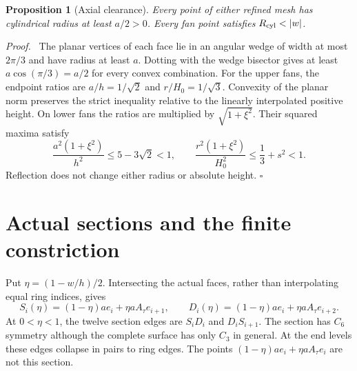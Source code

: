 \documentclass[11pt,a4paper]{article}
\numberwithin{equation}{section}
\newtheorem{proposition}[theorem]{Proposition}
\newenvironment{proof}[1][Proof]{\par\noindent\textit{#1.}\ \ignorespaces}
{\unskip\nobreak\hfill$\square$\par}
\begin{document}
\begin{proposition}[Axial clearance]\label{prop:clearance}
Every point of either refined mesh has cylindrical radius at least $a/2>0$.
Every fan point satisfies $R_{\rm cyl}<|w|$.
\end{proposition}
\begin{proof}
The planar vertices of each face lie in an angular wedge of width at most
$2\pi/3$ and have radius at least $a$. Dotting with the wedge bisector gives
at least $a\cos(\pi/3)=a/2$ for every convex combination. For the upper fans,
the endpoint ratios are $a/h=1/\sqrt2$ and $r/H_0=1/\sqrt3$. Convexity of
the planar norm preserves the strict inequality relative to the linearly
interpolated positive height. On lower fans the ratios are multiplied by
$\sqrt{1+\xi^2}$. Their squared maxima satisfy
\[
\frac{a^2(1+\xi^2)}{h^2}\leq5-3\sqrt2<1,\qquad
\frac{r^2(1+\xi^2)}{H_0^2}\leq\frac13+s^2<1.
\]
Reflection does not change either radius or absolute height.
\end{proof}

\section{Actual sections and the finite constriction}\label{sec:sections}
Put $\eta=(1-w/h)/2$. Intersecting the actual faces, rather than interpolating
equal ring indices, gives
\begin{equation}\label{eq:sectionvertices}
S_i(\eta)=(1-\eta)ae_i+\eta aA_\tau e_{i+1},\qquad
D_i(\eta)=(1-\eta)ae_i+\eta aA_\tau e_{i+2}.
\end{equation}
At $0<\eta<1$, the twelve section edges are $S_iD_i$ and $D_iS_{i+1}$.
The section has $C_6$ symmetry although the complete surface has only $C_3$
in general. At the end levels these edges collapse in pairs to ring edges.
The points $(1-\eta)ae_i+\eta aA_\tau e_i$ are not this section.
\end{document}
